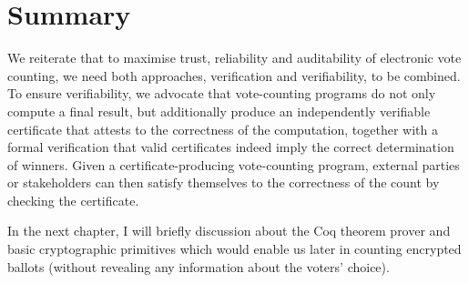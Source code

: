   
  
  
    
   
\section{Summary}
\label{secback:summary_back}
We reiterate that to maximise trust, reliability and auditability of electronic vote counting, we
need both approaches, verification and verifiability, to be combined. To ensure
verifiability, we advocate that vote-counting programs
do not only compute a final result, but additionally produce an
independently verifiable certificate that attests to the correctness
of the computation, together with a formal verification that
valid certificates indeed imply the correct determination of
winners. Given a certificate-producing vote-counting program, external
parties or stakeholders can then satisfy themselves to the
correctness of the count by checking the certificate.    

In the next chapter, I will  briefly discussion about the Coq theorem prover and basic cryptographic primitives which 
would enable us later in counting encrypted ballots (without revealing any information about the
voters' choice).